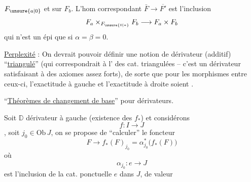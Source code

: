 $F_{\unsure{a|0}}$ et sur $F_b$.  L'hom correspondant $\bar F\longrightarrow\overline{F'}$ est l'inclusion
\[
F_a\times_{F_{\unsure{0|*}}}F_b\longrightarrow F_a\times F_b
\]
qui n'est un épi que si $\alpha=\beta=0$.

\uline{Perplexité} : On devrait pouvoir définir une notion de dérivateur (additif) ``\uline{triangulé}'' (qui correspondrait à l' des cat.  triangulées -- c'est un dérivateur satisfaisant à des axiomes assez forts), de sorte que pour les morphismes entre ceux-ci, l'exactitude à gauche et l'exactitude à droite soient \uline{}. 


 

``\uline{Théorèmes de changement de base}'' pour dérivateurs.

Soit $\mathbb D$ dérivateur à gauche (existence des $f_*$) et considérons
\[
f:I\longrightarrow J
\]
, soit $j_0\in\mathrm{Ob}\,J$, on se propose de ``calculer'' le foncteur
\[
F\longrightarrow f_*(F)_{j_0}=\alpha^*_{j_0}\big(f_*(F)\big)
\]
où
\[
\alpha_{j_0}:e\longrightarrow J
\]
est l'inclusion de la cat. ponctuelle $e$ dans $J$, de valeur   
